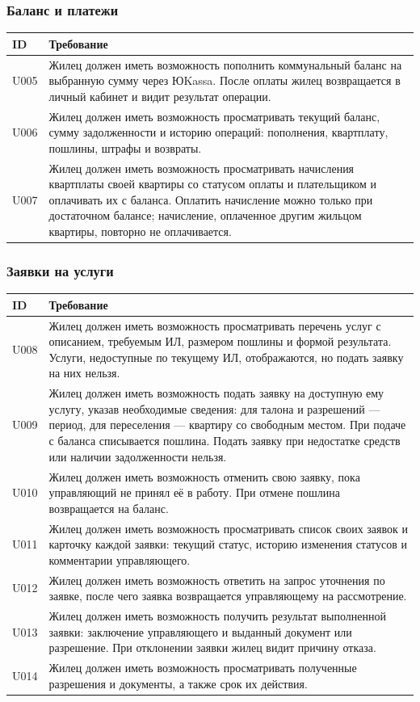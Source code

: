 \documentclass[12pt,a4paper]{article}
\newenvironment{reqtable}{%
  \begin{longtable}{L{14mm} L{146mm}}
  \toprule
  \textbf{ID} & \textbf{Требование} \\
  \midrule
  \endhead
  \bottomrule
  \endfoot
}{\end{longtable}}
\begin{document}
\subsubsection*{Баланс и платежи}
\begin{reqtable}
U005 & Жилец должен иметь возможность пополнить коммунальный баланс на выбранную сумму через ЮKassa. После оплаты жилец возвращается в личный кабинет и видит результат операции. \\
U006 & Жилец должен иметь возможность просматривать текущий баланс, сумму задолженности и историю операций: пополнения, квартплату, пошлины, штрафы и возвраты. \\
U007 & Жилец должен иметь возможность просматривать начисления квартплаты своей квартиры со статусом оплаты и плательщиком и оплачивать их с баланса. Оплатить начисление можно только при достаточном балансе; начисление, оплаченное другим жильцом квартиры, повторно не оплачивается. \\
\end{reqtable}

\subsubsection*{Заявки на услуги}
\begin{reqtable}
U008 & Жилец должен иметь возможность просматривать перечень услуг с описанием, требуемым ИЛ, размером пошлины и формой результата. Услуги, недоступные по текущему ИЛ, отображаются, но подать заявку на них нельзя. \\
U009 & Жилец должен иметь возможность подать заявку на доступную ему услугу, указав необходимые сведения: для талона и разрешений --- период, для переселения --- квартиру со свободным местом. При подаче с баланса списывается пошлина. Подать заявку при недостатке средств или наличии задолженности нельзя. \\
U010 & Жилец должен иметь возможность отменить свою заявку, пока управляющий не принял её в работу. При отмене пошлина возвращается на баланс. \\
U011 & Жилец должен иметь возможность просматривать список своих заявок и карточку каждой заявки: текущий статус, историю изменения статусов и комментарии управляющего. \\
U012 & Жилец должен иметь возможность ответить на запрос уточнения по заявке, после чего заявка возвращается управляющему на рассмотрение. \\
U013 & Жилец должен иметь возможность получить результат выполненной заявки: заключение управляющего и выданный документ или разрешение. При отклонении заявки жилец видит причину отказа. \\
U014 & Жилец должен иметь возможность просматривать полученные разрешения и документы, а также срок их действия. \\
\end{reqtable}
\end{document}
